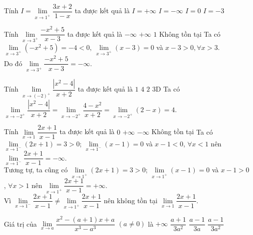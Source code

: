 \begin{ex}%
	Tính $I =\lim\limits_{x \to 1^+} \dfrac{3x+2}{1-x}$ ta được kết quả là
	\choice
	{$I=+\infty$}
	{\True $I=-\infty$}
	{$I=0$}
	{$I=-3$}
\end{ex}

\begin{ex}%
	Tính $\lim\limits_{x\to 3^+}\dfrac{-x^2+5}{x-3}$ ta được kết quả là
	\choice
	{\True $-\infty$}
	{$+\infty$}
	{$1$}
	{Không tồn tại}
	\loigiai
	{
		Ta có $\lim\limits_{x\to 3^+}(-x^2+5)=-4<0,\ \lim\limits_{x\to 3^+}(x-3)=0$ và $x-3>0,\forall x>3$.\\ Do đó $\lim\limits_{x\to 3^+}\dfrac{-x^2+5}{x-3}=-\infty$.
	}
\end{ex}

\begin{ex}%
	Tính $\lim\limits_{x\to (-2)^+}\dfrac{\left| x^2-4\right| }{x+2}$ ta được kết quả là
	\choice
	{$1$}
	{\True $4$}
	{$2$}
	{$3$D}
	\loigiai
	{
		Ta có $\lim\limits_{x\to -2^+}\dfrac{|x^2-4|}{x+2}=\lim\limits_{x\to -2^+}\dfrac{4-x^2}{x+2}=\lim\limits_{x\to -2^+}(2-x)=4$.
	}
\end{ex}

\begin{ex}%
	Tính $\lim\limits_{x\to 1} \dfrac{2x+1}{x-1}$ ta được kết quả là
	\choice
	{$0$}
	{$+\infty$}
	{$-\infty$}
	{\True Không tồn tại}
	\loigiai
	{
		Ta có $\lim\limits_{x\to 1^{-}}(2x+1)=3>0$; $\lim\limits_{x\to1^{-}}(x-1)=0$ và $x-1<0$, $\forall x<1$ nên $\lim\limits_{x\to 1^{-}}\dfrac{2x+1}{x-1}=-\infty$.\\
		Tương tự, ta cũng có $\lim\limits_{x\to 1^{+}}(2x+1)=3>0$; $\lim\limits_{x\to1^{+}}(x-1)=0$ và $x-1>0$, $\forall x>1$ nên $\lim\limits_{x\to 1^{+}}\dfrac{2x+1}{x-1}=+\infty$.\\
		Vì $\lim\limits_{x\to 1^{-}}\dfrac{2x+1}{x-1}\ne \lim\limits_{x\to 1^{+}}\dfrac{2x+1}{x-1}$ nên không tồn tại $\lim\limits_{x\to 1} \dfrac{2x+1}{x-1}$.
	}
\end{ex}

\begin{ex}%
	Giá trị của $\lim\limits_{x \to a} \dfrac{x^2 - \left( a + 1\right)x + a}{x^3 - a^3}$ $(a\ne 0)$ là
	\choice
	{$ + \infty $}
	{$\dfrac{a + 1}{3a^2}$}
	{$\dfrac{a - 1}{3a}$}
	{\True $\dfrac{a - 1}{3a^2}$}
\end{ex}

